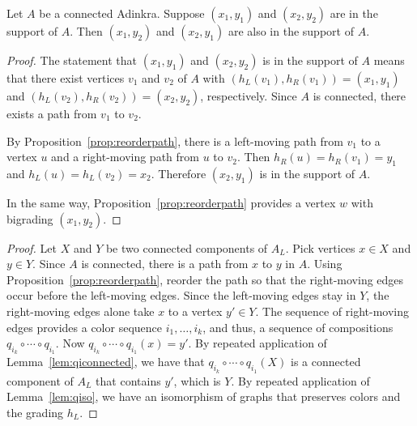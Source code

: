 \begin{prop}
\label{prop:rectangle-completion}
Let $A$ be a connected Adinkra.  Suppose $(x_1,y_1)$ and $(x_2,y_2)$ are in the support of $A$.  Then $(x_1,y_2)$ and $(x_2,y_1)$ are also in the support of $A$.
\end{prop}
\begin{proof}
The statement that $(x_1,y_1)$ and $(x_2,y_2)$ is in the support of $A$ means that there exist vertices $v_1$ and $v_2$ of $A$ with $(h_L(v_1),h_R(v_1))=(x_1,y_1)$ and $(h_L(v_2),h_R(v_2))=(x_2,y_2)$, respectively.  Since $A$ is connected, there exists a path from $v_1$ to $v_2$.

By Proposition~\ref{prop:reorderpath}, there is a left-moving path from $v_1$ to a vertex $u$ and a right-moving path from $u$ to $v_2$.  Then $h_R(u)=h_R(v_1)=y_1$ and $h_L(u)=h_L(v_2)=x_2$.  Therefore $(x_2,y_1)$ is in the support of $A$.

In the same way, Proposition~\ref{prop:reorderpath} provides a vertex $w$ with bigrading $(x_1,y_2)$.
\end{proof}

\begin{proof}
Let $X$ and $Y$ be two connected components of $A_L$. Pick vertices $x \in X$ and $y \in Y$. Since $A$ is connected, there is a path from $x$ to $y$ in $A$.  Using Proposition~\ref{prop:reorderpath}, reorder the path so that the right-moving edges occur before the left-moving edges. Since the left-moving edges stay in $Y$, the right-moving edges alone take $x$ to a vertex $y' \in Y$.  The sequence of right-moving edges provides a color sequence $i_1,\ldots,i_k$, and thus, a sequence of compositions $q_{i_k}\circ\cdots\circ q_{i_1}$.  Now $q_{i_k}\circ\cdots\circ q_{i_1}(x)=y'$.  By repeated application of Lemma~\ref{lem:qiconnected}, we have that $q_{i_k}\circ\cdots\circ q_{i_1}(X)$ is a connected component of $A_L$ that contains $y'$, which is $Y$.  By repeated application of Lemma~\ref{lem:qiso}, we have an isomorphism of graphs that preserves colors and the grading $h_L$.
\end{proof}


